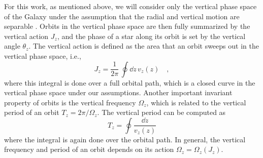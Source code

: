\documentclass[modern]{aastex631}
\begin{document}
For this work, as mentioned above, we will consider only the vertical phase space of the
Galaxy under the assumption that the radial and vertical motion are separable \citep[see
also, e.g.,][]{Oort:1932, Bahcall:1984,Kuijken:1989b, Kuijken:1991, Holmberg:2000,
Li:2021, Green:2023}.
Orbits in the vertical phase space are then fully summarized by the vertical action
$J_z$, and the phase of a star along its orbit is set by the vertical angle $\theta_z$.
The vertical action is defined as the area that an orbit sweeps out in the vertical
phase space, i.e.,
\begin{equation}
    J_z = \frac{1}{2\pi} \, \oint \dd z \, v_z(z) \quad, \label{eq:Jz}
\end{equation}
where this integral is done over a full orbital path, which is a closed curve in the
vertical phase space under our assumptions.
Another important invariant property of orbits is the vertical frequency $\Omega_z$,
which is related to the vertical period of an orbit $T_z = 2\pi / \Omega_z$.
The vertical period can be computed as
\begin{equation}
    T_z = \oint \frac{\dd z}{v_z(z)} \label{eq:Tz}
\end{equation}
where the integral is again done over the orbital path.
In general, the vertical frequency and period of an orbit depends on its action
$\Omega_z = \Omega_z(J_z)$.




\end{document}
